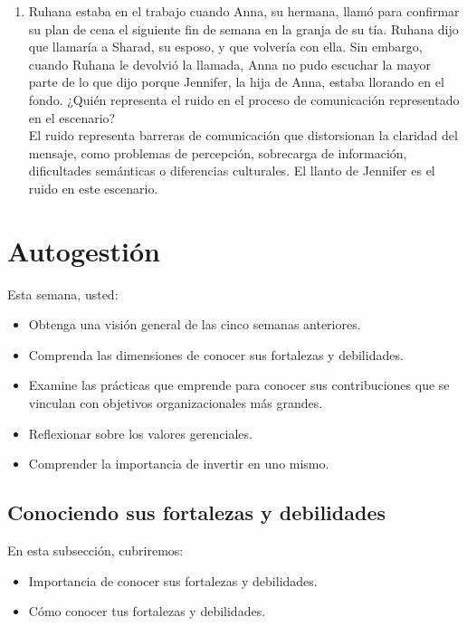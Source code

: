 \documentclass[10pt]{book}
\begin{document}
\begin{enumerate}[\bfseries 1.]
\item Ruhana estaba en el trabajo cuando Anna, su hermana, llamó para confirmar su plan de cena el siguiente fin de semana en la granja de su tía. Ruhana dijo que llamaría a Sharad, su esposo, y que volvería con ella. Sin embargo, cuando Ruhana le devolvió la llamada, Anna no pudo escuchar la mayor parte de lo que dijo porque Jennifer, la hija de Anna, estaba llorando en el fondo. ¿Quién representa el ruido en el proceso de comunicación representado en el escenario?\\
El ruido representa barreras de comunicación que distorsionan la claridad del mensaje, como problemas de percepción, sobrecarga de información, dificultades semánticas o diferencias culturales. El llanto de Jennifer es el ruido en este escenario.
\end{enumerate}

\chapter{Autogestión}
Esta semana, usted:
\begin{itemize}
\item Obtenga una visión general  de las cinco semanas anteriores.
\item Comprenda  las dimensiones de conocer sus fortalezas y debilidades.
\item Examine  las prácticas que emprende  para conocer sus contribuciones que se vinculan con objetivos organizacionales más grandes.
\item Reflexionar  sobre los valores gerenciales. 
\item Comprender la importancia de invertir en uno mismo.
\end{itemize}
\section{Conociendo sus fortalezas y debilidades}
En esta subsección, cubriremos:
\begin{itemize}
\item Importancia de conocer sus fortalezas y debilidades.
\item Cómo conocer tus  fortalezas y debilidades.
\end{itemize}
\end{document}
